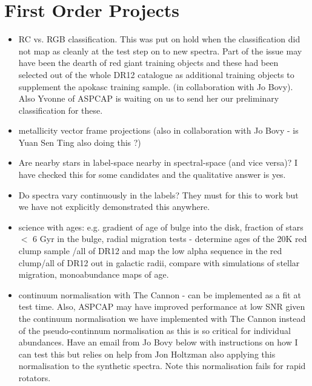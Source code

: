 \documentclass[11pt]{amsart}
\begin{document}
\section{First Order Projects}
\begin{itemize}
\item RC vs. RGB classification.
This was put on hold when the classification did not map as cleanly at the test step on to new spectra. Part of the issue may have been the dearth of red giant training objects and these had been selected out of the whole DR12 catalogue as additional training objects to supplement the apokasc training sample. (in collaboration with Jo Bovy). Also Yvonne of ASPCAP is waiting on us to send her our preliminary classification for these. 
\item metallicity vector frame projections (also in collaboration with Jo Bovy - is Yuan Sen Ting also doing this ?)
\item Are nearby stars in label-space nearby in spectral-space (and vice versa)?
I have checked this for some candidates and the qualitative answer is yes. 
\item Do spectra vary continuously in the labels?
They must for this to work but we have not explicitly demonstrated this anywhere.
\item science with ages: e.g. gradient of age of bulge into the disk, fraction of stars $<$ 6 Gyr in the bulge, radial migration tests - determine ages of the 20K red clump sample /all of DR12 and map the low alpha sequence in the red clump/all of DR12 out in galactic radii, compare with simulations of stellar migration, monoabundance maps of age. 
\item continuum normalisation with The Cannon - can be implemented as a fit at test time. Also, ASPCAP may have improved performance at low SNR given the continuum normalisation we have implemented with The Cannon instead of the pseudo-continnum normalisation as this is so critical for individual abundances. Have an email from Jo Bovy below with instructions on how I can test this but relies on help from Jon Holtzman also applying this normalisation to the synthetic spectra. Note this normalisation fails for rapid rotators. \\
\end{itemize} 
\end{document}
